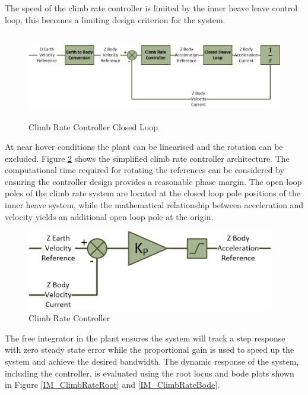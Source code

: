 	 The speed of the climb rate controller is limited by the inner heave leave control loop, this becomes a limiting design criterion for the system.
	 
	 \begin{figure}[H]
	 	\centering
	 	\includegraphics[height = 3.75cm]{../References/Diagrams/ClimbRateLoop.jpg}
	 	\caption{Climb Rate Controller Closed Loop}
	 	\label{IM_ClimbRateControlLoop}
	 \end{figure}
	 
	 At near hover conditions the plant can be linearised and the rotation can be excluded. Figure \ref{IM_ClimbRateController} shows the simplified climb rate controller architecture. The computational time required for rotating the references can be considered by ensuring the controller design provides a reasonable phase margin. The open loop poles of the climb rate system are located at the closed loop pole positions of the inner heave system, while the mathematical relationship between acceleration and velocity yields an additional open loop pole at the origin.
	 
	 \begin{figure}[H]
	 	\centering
	 	\includegraphics[height = 3.5cm]{../References/Diagrams/ClimbRateController.jpg}
	 	\caption{Climb Rate Controller}
	 	\label{IM_ClimbRateController}
	 \end{figure}		
	 
	 The free integrator in the plant ensures the system will track a step response with zero steady state error while the proportional gain is used to speed up the system and achieve the desired bandwidth.
	 The dynamic response of the system, including the controller, is evaluated using the root locus and bode plots shown in Figure \ref{IM_ClimbRateRoot} and \ref{IM_ClimbRateBode}.
	 
